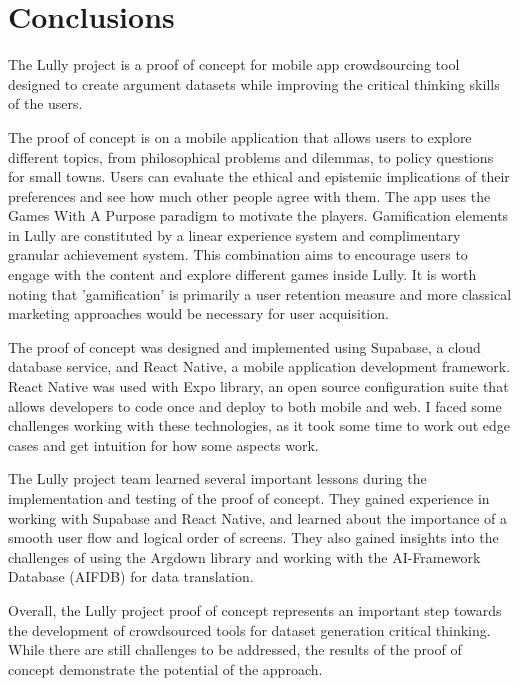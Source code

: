 \documentclass{article}
\begin{document}
\newpage

\chapter{Conclusions}

The Lully project is a proof of concept for mobile app crowdsourcing tool designed to create argument datasets while improving the critical thinking skills of the users. 

The proof of concept is on a mobile application that allows users to explore different topics, from philosophical problems and dilemmas, to policy questions for small towns. Users can evaluate the ethical and epistemic implications of their preferences and see how much other people agree with them. The app uses the Games With A Purpose paradigm to motivate the players. Gamification elements in Lully are constituted by a linear experience system and complimentary granular achievement system. This combination aims to encourage users to engage with the content and explore different games inside Lully. It is worth noting that 'gamification' is primarily a user retention measure and more classical marketing approaches would be necessary for user acquisition.

The proof of concept was designed and implemented using Supabase, a cloud database service, and React Native, a mobile application development framework. React Native was used with Expo library, an open source configuration suite that allows developers to code once and deploy to both mobile and web. I faced some challenges working with these technologies, as it took some time to work out edge cases and get intuition for how some aspects work.


The Lully project team learned several important lessons during the implementation and testing of the proof of concept. They gained experience in working with Supabase and React Native, and learned about the importance of a smooth user flow and logical order of screens. They also gained insights into the challenges of using the Argdown library and working with the AI-Framework Database (AIFDB) for data translation.

Overall, the Lully project proof of concept represents an important step towards the development of crowdsourced tools for dataset generation critical thinking. While there are still challenges to be addressed, the results of the proof of concept demonstrate the potential of the approach.

\newpage
\end{document}
